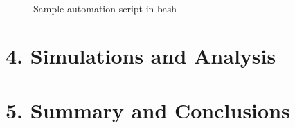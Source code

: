 \begin{center}
	\begin{figure}[h]
		\centering
		\\
		\caption{Sample automation script in bash}
	\end{figure}
\end{center}

\newpage\phantom{}

\section{4. Simulations and Analysis}
\section{5. Summary and Conclusions}
